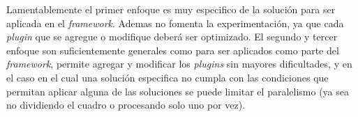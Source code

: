 Lamentablemente el primer enfoque es muy especifico de la solución para ser
aplicada en el \emph{framework}. Ademas no fomenta la experimentación, ya que
cada \emph{plugin} que se agregue o modifique deberá ser optimizado. El segundo
y tercer enfoque son suficientemente generales como para ser aplicados como
parte del \emph{framework}, permite agregar y modificar los \emph{plugins} sin
mayores dificultades, y en el caso en el cual una solución especifica no cumpla
con las condiciones que permitan aplicar alguna de las soluciones se puede
limitar el paralelismo (ya sea no dividiendo el cuadro o procesando solo uno por
vez).
